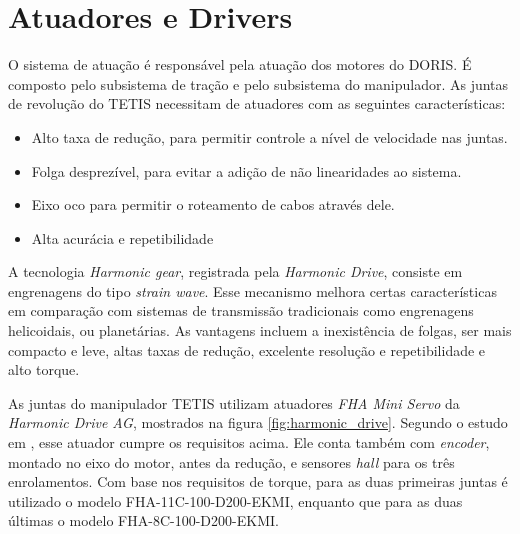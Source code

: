 \section{Atuadores e Drivers}

O sistema de atuação é responsável pela atuação dos motores do DORIS. É composto pelo subsistema de tração e pelo subsistema do manipulador. As juntas de revolução do TETIS necessitam de atuadores com as seguintes características:

\begin{itemize}
\item Alto taxa de redução, para permitir controle a nível de velocidade nas juntas.
\item Folga desprezível, para evitar a adição de não linearidades ao sistema. 
\item Eixo oco para permitir o roteamento de cabos através dele.
\item Alta acurácia e repetibilidade
\end{itemize}

A tecnologia \textit{Harmonic gear}, registrada pela \textit{Harmonic Drive}, consiste em engrenagens do tipo \textit{strain wave}. Esse mecanismo melhora certas características em comparação com sistemas de transmissão tradicionais como engrenagens helicoidais, ou planetárias. As vantagens incluem a inexistência de folgas, ser mais compacto e leve, altas taxas de redução, excelente resolução e repetibilidade e alto torque.

As juntas do manipulador TETIS utilizam atuadores \textit{FHA Mini Servo} da \textit{Harmonic Drive AG}, mostrados na figura \ref{fig:harmonic_drive}. Segundo o estudo em \citep{xaud2016doris}, esse atuador cumpre os requisitos acima. Ele conta também com \textit{encoder}, montado no eixo do motor, antes da redução, e sensores \textit{hall} para os três enrolamentos. Com base nos requisitos de torque, para as duas primeiras juntas é utilizado o modelo FHA-11C-100-D200-EKMI, enquanto que para as duas últimas o modelo FHA-8C-100-D200-EKMI.

\newlength{\twosubht}
\newsavebox{\twosubbox}

